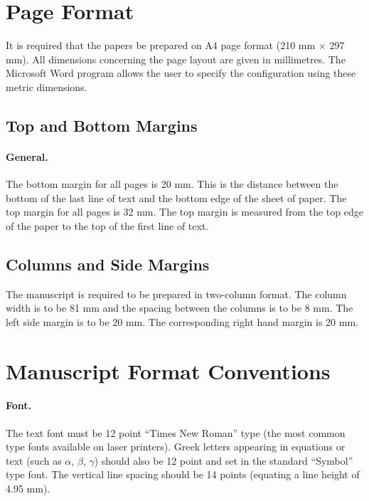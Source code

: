 \documentclass{stabs2021}
\begin{document}
\section{Page Format}

It is required that the papers be prepared on A4 page format (210 mm
\(\times\) 297 mm). All dimensions concerning the page layout are
given in millimetres. The Microsoft Word program allows the user to
specify the configuration using these metric dimensions.

\subsection{Top and Bottom Margins}

\paragraph{General.}

The bottom margin for all pages is 20 mm. This is the distance between
the bottom of the last line of text and the bottom edge of the sheet
of paper. The top margin for all pages is 32 mm. The top margin is
measured from the top edge of the paper to the top of the first line
of text.

\subsection{Columns and Side Margins}

The manuscript is required to be prepared in two-column format. The
column width is to be 81 mm and the spacing between the columns is to
be 8 mm. The left side margin is to be 20 mm. The corresponding right
hand margin is 20 mm.

\section{Manuscript Format Conventions}

\paragraph{Font.}

The text font must be 12 point ``Times New Roman'' type (the most
common type fonts available on laser printers). Greek letters
appearing in equations or text (such as \(\alpha\), \(\beta\),
\(\gamma\)) should also be 12 point and set in the standard ``Symbol''
type font. The vertical line spacing should be 14 points (equating a
line height of 4.95 mm).
\end{document}
